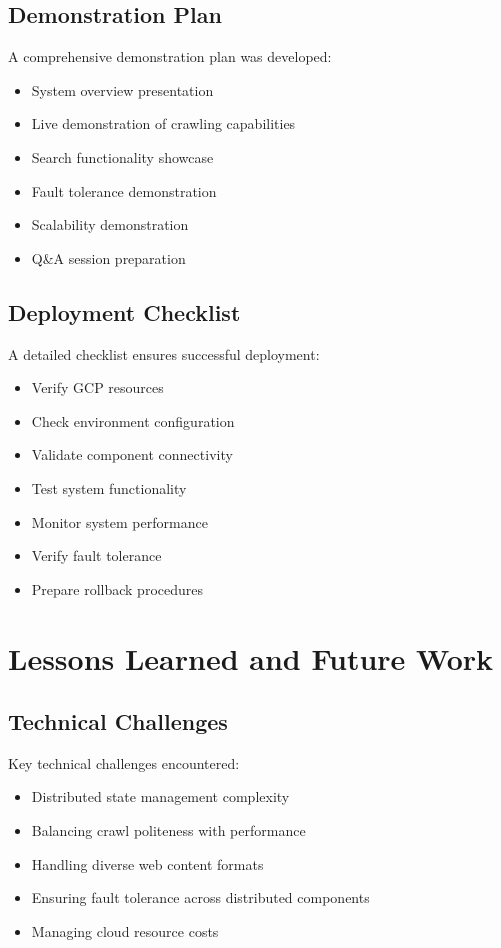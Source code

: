 \documentclass[12pt,a4paper]{report}
\begin{document}
\section{Demonstration Plan}
A comprehensive demonstration plan was developed:
\begin{itemize}
    \item System overview presentation
    \item Live demonstration of crawling capabilities
    \item Search functionality showcase
    \item Fault tolerance demonstration
    \item Scalability demonstration
    \item Q\&A session preparation
\end{itemize}

\section{Deployment Checklist}
A detailed checklist ensures successful deployment:
\begin{itemize}
    \item Verify GCP resources
    \item Check environment configuration
    \item Validate component connectivity
    \item Test system functionality
    \item Monitor system performance
    \item Verify fault tolerance
    \item Prepare rollback procedures
\end{itemize}

\chapter{Lessons Learned and Future Work}

\section{Technical Challenges}
Key technical challenges encountered:
\begin{itemize}
    \item Distributed state management complexity
    \item Balancing crawl politeness with performance
    \item Handling diverse web content formats
    \item Ensuring fault tolerance across distributed components
    \item Managing cloud resource costs
\end{itemize}
\end{document}
